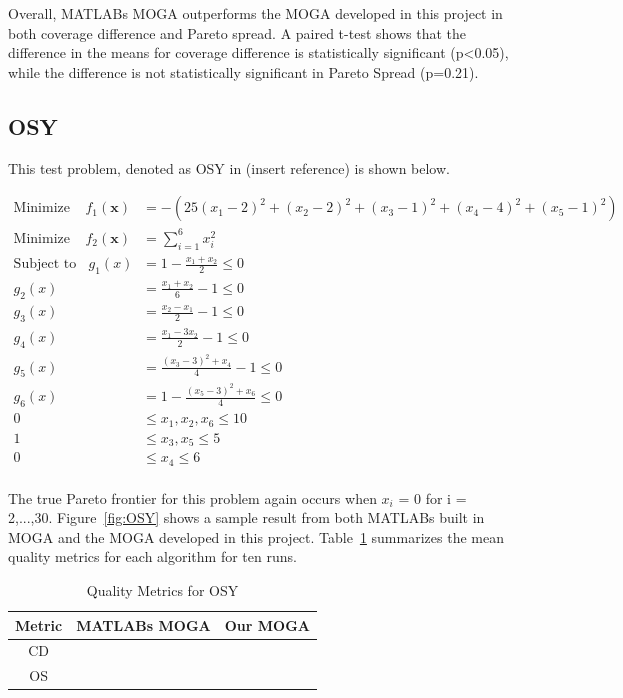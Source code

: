 \documentclass{article}
\begin{document}
Overall, MATLABs MOGA outperforms the MOGA developed in this project in both coverage difference and Pareto spread. A paired t-test shows that the difference in the means for coverage difference is statistically significant (p<0.05), while the difference is not statistically significant in Pareto Spread (p=0.21). 

\subsection{OSY} 
This test problem, denoted as OSY in (insert reference) is shown below. 


\begin{align*}
\textrm{Minimize} ~~~~~ f_1(\textbf{x}) &= -(25(x_1-2)^2+(x_2-2)^2+(x_3-1)^2+(x_4-4)^2+(x_5-1)^2) \\
\textrm{Minimize} ~~~~~ f_2(\textbf{x}) &= \sum_{i=1}^{6}x_i^2 \\
\textrm{Subject to} ~~~~ g_1(x) &= 1-\frac{x_1+x_2}{2} \leq 0 \\
g_2(x) &= \frac{x_1+x_2}{6}-1 \leq 0 \\
g_3(x) &= \frac{x_2-x_1}{2}-1 \leq 0 \\
g_4(x) &= \frac{x_1-3x_2}{2}-1 \leq 0 \\
g_5(x) &= \frac{(x_3-3)^2+x_4}{4}-1 \leq 0 \\
g_6(x) &= 1-\frac{(x_5-3)^2+x_6}{4} \leq 0 \\
0 &\leq  x_1,x_2,x_6  \leq 10 \\
1 &\leq  x_3,x_5  \leq 5 \\
0 &\leq  x_4  \leq 6 \\
\end{align*}

The true Pareto frontier for this problem again occurs when $x_i$ = 0 for i = 2,...,30. Figure~\ref{fig:OSY} shows a sample result from both MATLABs built in MOGA and the MOGA developed in this project. Table~\ref{tab:OSY} summarizes the mean quality metrics for each algorithm for ten runs.

\begin{table}[h]
\caption{Quality Metrics for OSY} 
\centering 
\begin{tabular}{|c|c|c|} 
\hline\hline  
Metric & MATLABs MOGA & Our MOGA \\ \hline
CD &  &   \\ \hline
OS &  &  \\ \hline
\end{tabular}
\label{tab:OSY} 
\end{table}
\end{document}
